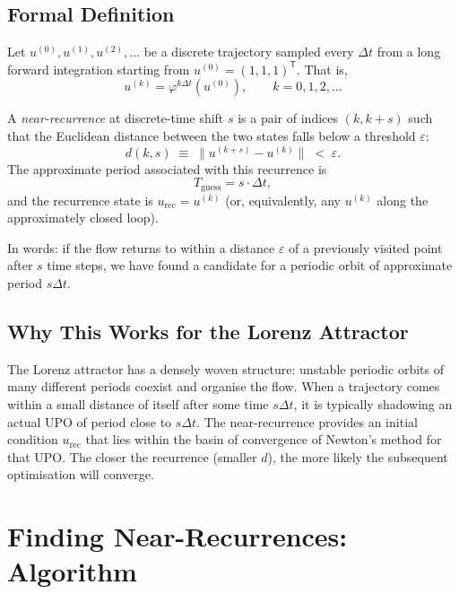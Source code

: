 \documentclass[11pt,a4paper]{article}
\begin{document}
\subsection{Formal Definition}
Let $u^{(0)}, u^{(1)}, u^{(2)}, \dots$ be a
discrete trajectory sampled every $\Delta t$ from a long forward integration
starting from $u^{(0)} = (1,1,1)^{\mathsf{T}}$.  That is,
\begin{equation}
  u^{(k)} = \varphi^{k\Delta t}(u^{(0)}), \qquad k = 0, 1, 2, \dots
\end{equation}

A \emph{near-recurrence} at discrete-time shift $s$ is a pair of indices
$(k, k+s)$ such that the Euclidean distance between the two states falls
below a threshold $\varepsilon$:
\begin{equation}\label{eq:near_recurrence}
  d(k, s) \;\equiv\; \bigl\|u^{(k+s)} - u^{(k)}\bigr\|
  \;<\; \varepsilon.
\end{equation}
The approximate period associated with this recurrence is
\begin{equation}
  T_{\text{guess}} = s \cdot \Delta t,
\end{equation}
and the recurrence state is $u_{\text{rec}} = u^{(k)}$ (or,
equivalently, any $u^{(k)}$ along the approximately closed loop).

In words: if the flow returns to within a distance $\varepsilon$ of a
previously visited point after $s$ time steps, we have found a candidate for
a periodic orbit of approximate period $s\Delta t$.

\subsection{Why This Works for the Lorenz Attractor}
The Lorenz attractor has a densely woven structure: unstable periodic orbits
of many different periods coexist and organise the flow.  When a trajectory
comes within a small distance of itself after some time $s\Delta t$, it is
typically shadowing an actual UPO of period close to $s\Delta t$.  The
near-recurrence provides an initial condition $u_{\text{rec}}$ that
lies within the basin of convergence of Newton's method for that UPO.  The
closer the recurrence (smaller $d$), the more likely the subsequent
optimisation will converge.

\section{Finding Near-Recurrences: Algorithm}
\end{document}
